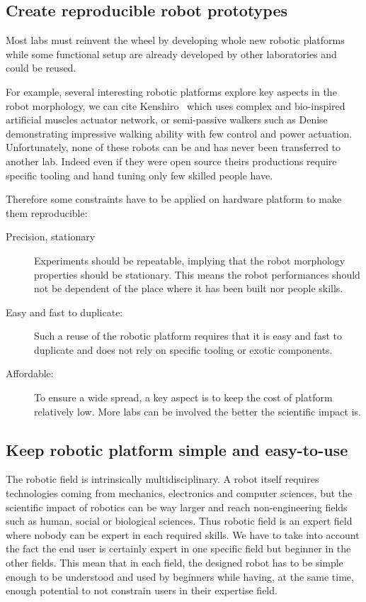 \subsection{Create reproducible robot prototypes} %

Most labs must reinvent the wheel by developing whole new robotic platforms while some functional setup are already developed by other laboratories and could be reused.

For example, several interesting robotic platforms explore key aspects in the robot morphology, we can cite Kenshiro~\cite{REF} which uses complex and bio-inspired artificial muscles actuator network, or semi-passive walkers such as Denise~\cite{REF} demonstrating impressive walking ability with few control and power actuation. Unfortunately, none of these robots can be and has never been transferred to another lab. Indeed even if they were open source theirs productions require specific tooling and hand tuning only few skilled people have.

Therefore some constraints have to be applied on hardware platform to make them reproducible:
\begin{description}
    \item[Precision, stationary] Experiments should be repeatable, implying that the robot morphology properties should be stationary. This means the robot performances should not be dependent of the place where it has been built nor people skills.
    \item[Easy and fast to duplicate:] Such a reuse of the robotic platform requires that it is easy and fast to duplicate and does not rely on specific tooling or exotic components.
    \item[Affordable:] To ensure a wide spread, a key aspect is to keep the cost of platform relatively low. More labs can be involved the better the scientific impact is.
\end{description}


\subsection{Keep robotic platform simple and easy-to-use} %

The robotic field is intrinsically multidisciplinary. A robot itself requires technologies coming from mechanics, electronics and computer sciences, but the scientific impact of robotics can be way larger and reach non-engineering fields such as human, social or biological sciences. Thus robotic field is an expert field where nobody can be expert in each required skills.
We have to take into account the fact the end user is certainly expert in one specific field but beginner in the other fields. This mean that in each field, the designed robot has to be simple enough to be understood and used by beginners while having, at the same time, enough potential to not constrain users in their expertise field.




